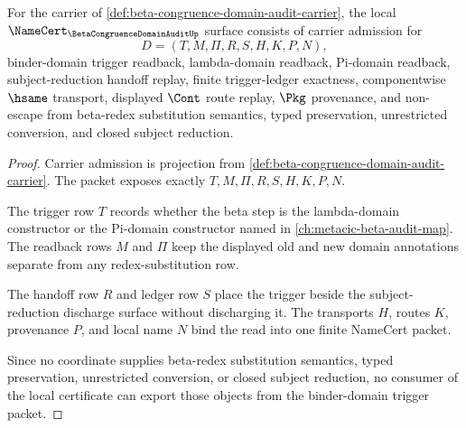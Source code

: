 \begin{theorem}
\label{thm:beta-congruence-domain-audit-namecert-obligations}
For the carrier of \autoref{def:beta-congruence-domain-audit-carrier}, the local $\NameCert_{\BetaCongruenceDomainAuditUp}$ surface consists of carrier admission for
$$
D=(T,M,\Pi,R,S,H,K,P,N),
$$
binder-domain trigger readback, lambda-domain readback, Pi-domain readback, subject-reduction handoff replay, finite trigger-ledger exactness, componentwise $\hsame$ transport, displayed $\Cont$ route replay, $\Pkg$ provenance, and non-escape from beta-redex substitution semantics, typed preservation, unrestricted conversion, and closed subject reduction.
\end{theorem}
\begin{proof}
Carrier admission is projection from \autoref{def:beta-congruence-domain-audit-carrier}. The packet exposes exactly $T,M,\Pi,R,S,H,K,P,N$.

The trigger row $T$ records whether the beta step is the lambda-domain constructor or the Pi-domain constructor named in \autoref{ch:metacic-beta-audit-map}. The readback rows $M$ and $\Pi$ keep the displayed old and new domain annotations separate from any redex-substitution row.

The handoff row $R$ and ledger row $S$ place the trigger beside the subject-reduction discharge surface without discharging it. The transports $H$, routes $K$, provenance $P$, and local name $N$ bind the read into one finite NameCert packet.

Since no coordinate supplies beta-redex substitution semantics, typed preservation, unrestricted conversion, or closed subject reduction, no consumer of the local certificate can export those objects from the binder-domain trigger packet.
\end{proof}

